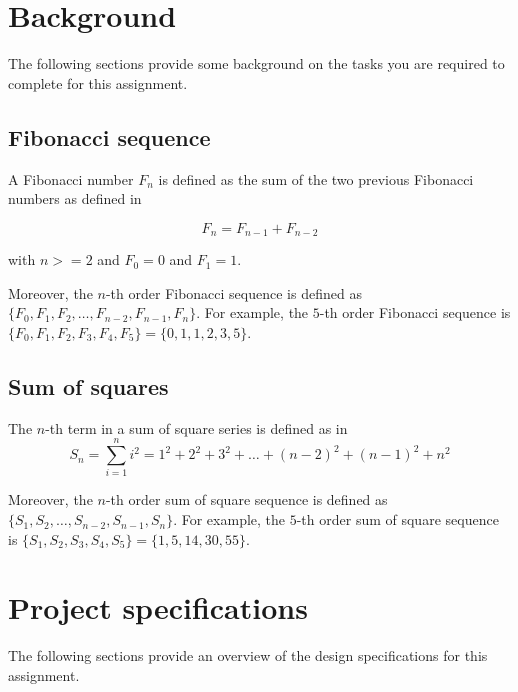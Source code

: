 \documentclass[number=03]{assignment}
\newcommand{\Fibonacci}{Fibonacci\xspace}
\begin{document}
\newpage
\section{Background}
The following sections provide some background on the tasks you are required to complete for this assignment.

\subsection{Fibonacci sequence}
A \Fibonacci number $F_{n}$ is defined as the sum of the two previous \Fibonacci numbers as defined in 

\begin{equation}
\label{Equation:Fibonacci}
F_{n} = F_{n-1} + F_{n-2}
\end{equation}

with $n>=2$ and $F_{0} = 0$ and $F_{1} = 1$.

Moreover, the $n$-th order \Fibonacci sequence is defined as $\{F_{0}, F_{1}, F_{2}, \dots, F_{n-2},  F_{n-1}, F_{n}\}$. 
For example, the $5$-th order \Fibonacci sequence is $\{F_{0}, F_{1}, F_{2}, F_{3},  F_{4}, F_{5}\} = \{0, 1, 1, 2, 3, 5\}$.

\subsection{Sum of squares}
The $n$-th term in a sum of square series is defined as in 
\begin{equation}
\label{Equation:SumSquare}
S_{n} = \sum_{i=1}^{n}i^{2} = 1^{2} + 2^{2} + 3^{2} + \dots + (n-2)^{2} + (n-1)^{2} + n^{2}
\end{equation}

Moreover, the $n$-th order sum of square sequence is defined as $\{S_{1}, S_{2}, \dots, S_{n-2},  S_{n-1}, S_{n}\}$.
For example, the $5$-th order sum of square sequence is $\{S_{1}, S_{2}, S_{3},  S_{4}, S_{5}\} = \{1, 5, 14, 30, 55\}$.

\section{Project specifications}
The following sections provide an overview of the design specifications for this assignment.
\end{document}
